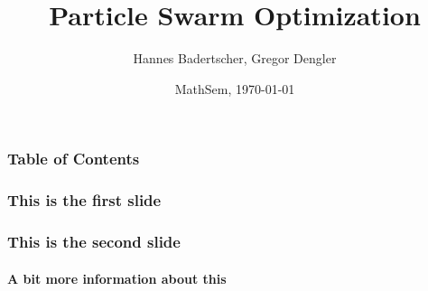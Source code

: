 \documentclass{beamer}
\title{Particle Swarm Optimization}
\author[Badertscher, Dengler]{Hannes Badertscher, Gregor Dengler}
\date [MathSem, FS13]{MathSem, \today}
\begin{document}
	\begin{frame}
		\titlepage
	\end{frame}

	\begin{frame}
		\frametitle{Table of Contents}
		\tableofcontents[currentsection]
	\end{frame}
  
	\begin{frame}
	    \frametitle{This is the first slide}
    \end{frame}
  
	\begin{frame}
	    \frametitle{This is the second slide}
	    \framesubtitle{A bit more information about this}   
  	\end{frame}
\end{document}
